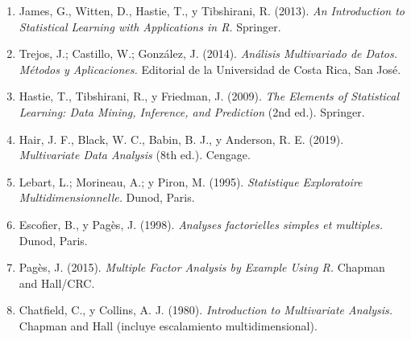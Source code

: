 \begin{refsection}
\begin{enumerate}
\item James, G., Witten, D., Hastie, T., y Tibshirani, R. (2013). \emph{An Introduction to Statistical Learning with Applications in R.} Springer.
\item Trejos, J.; Castillo, W.; González, J. (2014). \emph{Análisis Multivariado de Datos. Métodos y Aplicaciones.} Editorial de la Universidad de Costa Rica, San José.
\item Hastie, T., Tibshirani, R., y Friedman, J. (2009). \emph{The Elements of Statistical Learning: Data Mining, Inference, and Prediction} (2nd ed.). Springer.
\item Hair, J. F., Black, W. C., Babin, B. J., y Anderson, R. E. (2019). \emph{Multivariate Data Analysis} (8th ed.). Cengage.
\item Lebart, L.; Morineau, A.; y Piron, M. (1995). \emph{Statistique Exploratoire Multidimensionnelle.} Dunod, Paris.
\item Escofier, B., y Pagès, J. (1998). \emph{Analyses factorielles simples et multiples.} Dunod, Paris.
\item Pagès, J. (2015). \emph{Multiple Factor Analysis by Example Using R.} Chapman and Hall/CRC.
\item Chatfield, C., y Collins, A. J. (1980). \emph{Introduction to Multivariate Analysis.} Chapman and Hall (incluye escalamiento multidimensional).
\end{enumerate}

\end{refsection}

